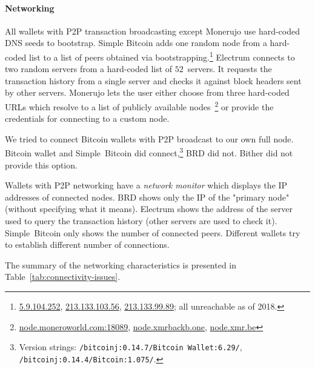 \paragraph{Networking}
All wallets with P2P transaction broadcasting except Monerujo use hard-coded DNS seeds to bootstrap.
Simple Bitcoin adds one random node from a hard-coded list to a list of peers obtained via bootstrapping.\footnote{\url{5.9.104.252}, \url{213.133.103.56}, \url{213.133.99.89}; all unreachable as of 2018.}
Electrum connects to two random servers from a hard-coded list of $52$~servers.
It requests the transaction history from a single server and checks it against block headers sent by other servers.
Monerujo lets the user either choose from three hard-coded URLs which resolve to a list of publicly available nodes~\footnote{\url{node.moneroworld.com:18089}, \url{node.xmrbackb.one}, \url{node.xmr.be}} or provide the credentials for connecting to a custom node.

We tried to connect Bitcoin wallets with P2P broadcast to our own full node.
Bitcoin wallet and Simple~Bitcoin did connect,\footnote{Version strings: \texttt{/bitcoinj:0.14.7/Bitcoin Wallet:6.29/}, \texttt{/bitcoinj:0.14.4/Bitcoin:1.075/}.} BRD did not.
Bither did not provide this option.

Wallets with P2P networking have a \textit{network monitor} which displays the IP addresses of connected nodes.
BRD shows only the IP of the "primary node" (without specifying what it means).
Electrum shows the address of the server used to query the transaction history (other servers are used to check it).
Simple~Bitcoin only shows the number of connected peers.
Different wallets try to establish different number of connections.

The summary of the networking characteristics is presented in Table~\ref{tab:connectivity-issues}.


